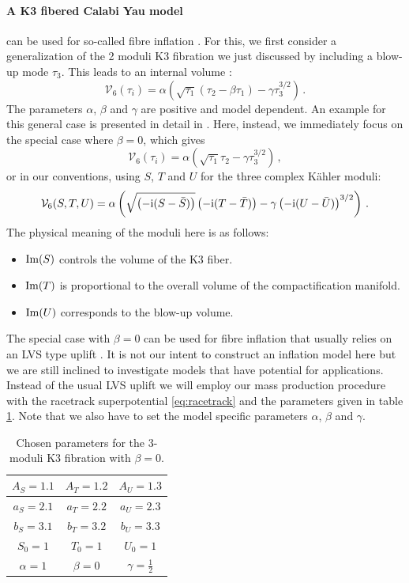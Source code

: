 \documentclass[12pt]{report}
\newcommand{\be}{\begin{equation}}
\newcommand{\ee}{\end{equation}}
\def\rmi{{\rm i}}
\def\rmim{{\rm Im}}
\begin{document}
\paragraph{A K3 fibered Calabi Yau model} can be used for so-called fibre inflation \cite{Cicoli:2008gp,Burgess:2016owb,Kallosh:2017wku}. For this, we first consider a generalization of the 2 moduli K3 fibration we just discussed by including a blow-up mode $\tau_3$. This leads to an internal volume \cite{Cicoli:2008gp}:
\be 
\mathcal{V}_6 (\tau_i) = \alpha \left( \sqrt{\tau_1} (\tau_2 - \beta \tau_1 ) - \gamma \tau_3^{3/2} \right)\,.
\ee
The parameters $\alpha$, $\beta$ and $\gamma$ are positive and model dependent. An example for this general case is presented in detail in \cite{Cribiori:2019drf}. Here, instead, we immediately focus on the special case where $\beta = 0$, which gives
\be 
\mathcal{V}_6 (\tau_i) = \alpha \left( \sqrt{\tau_1} \tau_2  - \gamma \tau_3^{3/2} \right)\,,
\ee
or in our conventions, using $S$, $T$ and $U$ for the three complex Kähler moduli:
\be 
\mathcal{V}_6 (S,T,U) = \alpha \left( \sqrt{\left(-\rmi ( S- \bar{S})\right)} \left(-\rmi (T-\bar{T})\right) - \gamma \left(-\rmi (U-\bar{U})\right)^{3/2} \right)\,.
\ee
The physical meaning of the moduli here is as follows:
\begin{itemize}
\item $\rmim(S)$ controls the volume of the K3 fiber.
\item $\rmim(T)$ is proportional to the overall volume of the compactification manifold.
\item $\rmim(U)$ corresponds to the blow-up volume.
\end{itemize}
The special case with $\beta=0$ can be used for fibre inflation that usually relies on an LVS type uplift \cite{Balasubramanian:2005zx}. It is not our intent to construct an inflation model here but we are still inclined to investigate models that have potential for applications. Instead of the usual LVS uplift we will employ our mass production procedure with the racetrack superpotential \eqref{eq:racetrack} and the parameters given in table \ref{tab:fibrepara}. Note that we also have to set the model specific parameters $\alpha$, $\beta$ and $\gamma$.
\begin{table}[htb]
\centering
\begin{tabular}{|c|c|c|}\hline
$A_S = 1.1$ & $A_T = 1.2$ & $A_U =1.3$\\\hline
$a_S = 2.1$ & $a_T = 2.2$ & $a_U = 2.3$\\\hline
$b_S = 3.1$ & $b_T = 3.2$ & $b_U = 3.3$\\\hline
$S_0 = 1$ & $T_0 = 1$ & $U_0 = 1$\\\hline
$\alpha = 1$ & $\beta=0$ & $\gamma = \frac{1}{2} $ \\\hline
\end{tabular}
\caption{  Chosen parameters for the 3-moduli K3 fibration with $\beta = 0$.}
\label{tab:fibrepara}
\end{table}
\end{document}
